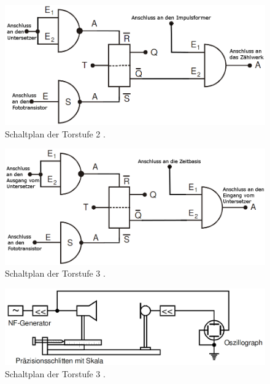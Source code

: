 \begin{figure}
	\centering
	\includegraphics[width=\linewidth-50pt,height=\textheight-50pt,keepaspectratio]{content/Bilder/Torstufe2.png}
	\caption{Schaltplan der Torstufe 2 \cite{V104}.}
	\label{fig:Aufbau77}
\end{figure}
\begin{figure}
	\centering
	\includegraphics[width=\linewidth-50pt,height=\textheight-50pt,keepaspectratio]{content/Bilder/Torstufe3.png}
	\caption{Schaltplan der Torstufe 3 \cite{V104}.}
	\label{fig:Aufbau-47}
\end{figure}
\begin{figure}
	\centering
	\includegraphics[width=\linewidth-50pt,height=\textheight-50pt,keepaspectratio]{content/Bilder/Lambda.png}
	\caption{Schaltplan der Torstufe 3 \cite{V104}.}
	\label{fig:lamb}
\end{figure}

